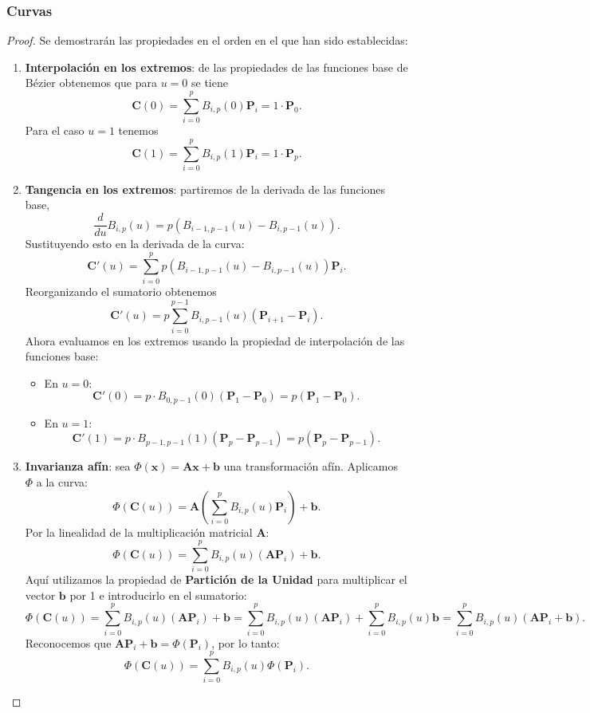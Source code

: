 \documentclass[11pt]{book}
\theoremstyle{plain} %
\theoremstyle{definition} %
\theoremstyle{definition} %
\begin{document}
\subsubsection{Curvas}
\begin{proof}Se demostrarán las propiedades en el orden en el que han sido establecidas:
    \begin{enumerate}
        \item \textbf{Interpolación en los extremos}: de las propiedades de las funciones base de Bézier obtenemos que para $u=0$ se tiene
                $$\mathbf{C}(0) = \sum_{i=0}^{p} B_{i,p}(0)\mathbf{P}_i = 1 \cdot \mathbf{P}_0 .$$
                Para el caso $u=1$ tenemos
                $$\mathbf{C}(1) = \sum_{i=0}^{p} B_{i,p}(1)\mathbf{P}_i = 1 \cdot \mathbf{P}_p .$$
        \item \textbf{Tangencia en los extremos}: partiremos de la derivada de las funciones base,
                $$ \frac{d}{du} B_{i,p}(u) = p \left( B_{i-1, p-1}(u) - B_{i, p-1}(u) \right). $$
                Sustituyendo esto en la derivada de la curva:
                $$ \mathbf{C}'(u) = \sum_{i=0}^{p} p \left( B_{i-1, p-1}(u) - B_{i, p-1}(u) \right) \mathbf{P}_i. $$
                Reorganizando el sumatorio obtenemos
                $$ \mathbf{C}'(u) = p \sum_{i=0}^{p-1} B_{i,p-1}(u) (\mathbf{P}_{i+1} - \mathbf{P}_i). $$
                Ahora evaluamos en los extremos usando la propiedad de interpolación de las funciones base:
                \begin{itemize}
                    \item En $u=0$:
                    $$ \mathbf{C}'(0) = p \cdot B_{0,p-1}(0) (\mathbf{P}_{1} - \mathbf{P}_0) = p(\mathbf{P}_1 - \mathbf{P}_0). $$
                    \item En $u=1$:
                    $$ \mathbf{C}'(1) = p \cdot B_{p-1,p-1}(1) (\mathbf{P}_{p} - \mathbf{P}_{p-1}) = p(\mathbf{P}_p - \mathbf{P}_{p-1}). $$
                \end{itemize}
        \item \textbf{Invarianza afín}: sea $\Phi(\mathbf{x}) = \mathbf{A}\mathbf{x} + \mathbf{b}$ una transformación afín. Aplicamos $\Phi$ a la curva:
                    $$ \Phi(\mathbf{C}(u)) = \mathbf{A} \left( \sum_{i=0}^{p} B_{i,p}(u)\mathbf{P}_i \right) + \mathbf{b}. $$
                    Por la linealidad de la multiplicación matricial $\mathbf{A}$:
                    $$ \Phi(\mathbf{C}(u)) = \sum_{i=0}^{p} B_{i,p}(u) (\mathbf{A}\mathbf{P}_i) + \mathbf{b}. $$
                    Aquí utilizamos la propiedad de \textbf{Partición de la Unidad} para multiplicar el vector $\mathbf{b}$ por 1 e introducirlo en el sumatorio:                    
                    $$ \Phi(\mathbf{C}(u)) = \sum_{i=0}^{p} B_{i,p}(u) (\mathbf{A}\mathbf{P}_i) + \mathbf{b} = \sum_{i=0}^{p} B_{i,p}(u) (\mathbf{A}\mathbf{P}_i) + \sum_{i=0}^{p} B_{i,p}(u)\mathbf{b} = \sum_{i=0}^{p} B_{i,p}(u) (\mathbf{A}\mathbf{P}_i + \mathbf{b}). $$
                    Reconocemos que $\mathbf{A}\mathbf{P}_i + \mathbf{b} = \Phi(\mathbf{P}_i)$, por lo tanto:
                    $$ \Phi(\mathbf{C}(u)) = \sum_{i=0}^{p} B_{i,p}(u) \Phi(\mathbf{P}_i). $$
    \end{enumerate}
\end{proof}
\end{document}
